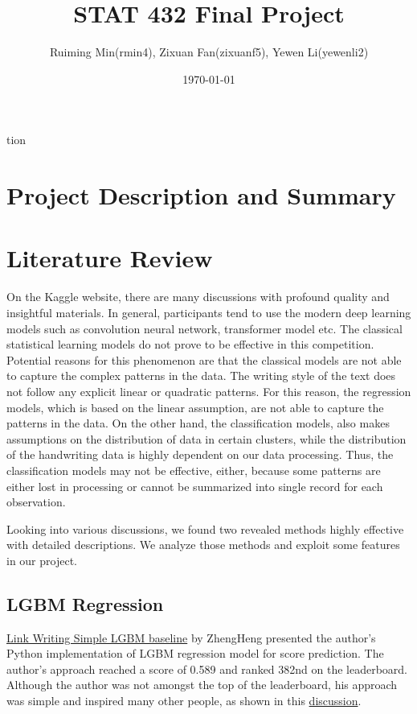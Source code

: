 tion\documentclass[8pt]{article}
\title{STAT 432 Final Project}
\author{Ruiming Min(rmin4), Zixuan Fan(zixuanf5), Yewen Li(yewenli2)}
\date{\today}
\begin{document}
\maketitle

\section{Project Description and Summary}

\section{Literature Review}
On the Kaggle website, there are many discussions with profound quality and insightful materials. 
In general, participants tend to use the modern deep learning models such as convolution neural network,
transformer model etc. The classical statistical learning models do not prove to be effective in this competition. 
Potential reasons for this phenomenon are that the classical models are not able to capture the complex patterns in the data. 
The writing style of the text does not follow any explicit linear or quadratic patterns. 
For this reason, the regression models, which is based on the linear assumption, are not able to capture the patterns in the data.
On the other hand, the classification models, also makes assumptions on the distribution of data in certain clusters, 
while the distribution of the handwriting data is highly dependent on our data processing. 
Thus, the classification models may not be effective, either, because some patterns are either lost in processing or cannot be summarized into single 
record for each observation. 

Looking into various discussions, we found two revealed methods highly effective with detailed descriptions. 
We analyze those methods and exploit some features in our project. 
\subsection{LGBM Regression}
\href{https://www.kaggle.com/code/hengzheng/link-writing-simple-lgbm-baseline}{Link Writing Simple LGBM baseline} by ZhengHeng
presented the author's Python implementation of LGBM regression model for score prediction. The author's approach 
reached a score of 0.589 and ranked 382nd on the leaderboard. Although the author was not amongst the top of the leaderboard, 
his approach was simple and inspired many other people, as shown in this \href{https://www.kaggle.com/competitions/linking-writing-processes-to-writing-quality/discussion/451081}{discussion}.
\end{document}
